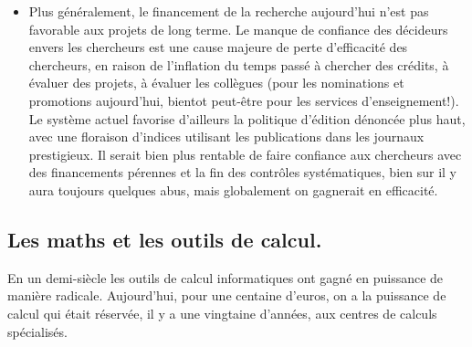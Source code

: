 \documentclass[a4paper,11pt]{article}
\begin{document}
\begin{giacjshere}
\begin{itemize}
patrimomiaux sur un logiciel c'est l'employeur de l'auteur et
pas l'auteur lui-m\^eme, or les responsables de projets,
universit\'es et autres organismes
publics de recherche sont beaucoup plus r\'eticentes au logiciel
libre que les auteurs eux-m\^emes ... surtout s'ils ont des organismes
de valorisation. Ce n'est pas seulement une question financi\`ere
mais tout simplement de qui controle quoi, une fois un logiciel
lib\'er\'e, le contr\^ole est dans les mains des personnes qui codent,
et \'echappe aux services de valorisation ou aux scientifiques
qui dirigent le projet\footnote{ainsi Allan Steel, le principal codeur du logiciel 
Magma, dont l'attractivit\'e doit tout au g\'enie algorithmique de cet
auteur, n'apparait m\^eme pas dans la citation recommend\'ee
du logiciel.}.
\item Plus g\'en\'eralement, le financement de la recherche
aujourd'hui n'est pas favorable aux projets de long terme.
Le manque de confiance des d\'ecideurs envers les chercheurs
est une cause majeure de perte d'efficacit\'e des chercheurs,
en raison de l'inflation du temps pass\'e \`a chercher des cr\'edits,
\`a \'evaluer des projets, \`a \'evaluer les coll\`egues
(pour les nominations et promotions aujourd'hui, bientot peut-\^etre pour les services
d'enseignement!). Le syst\`eme actuel favorise d'ailleurs la politique
d'\'edition d\'enonc\'ee plus haut, avec une floraison d'indices utilisant
les publications dans les journaux prestigieux. Il serait bien plus
rentable de faire confiance aux chercheurs avec des financements
p\'erennes et la fin des contr\^oles syst\'ematiques, bien sur il y aura
toujours quelques abus, mais globalement on gagnerait en efficacit\'e.
\end{itemize}

\subsection{Les maths et les outils de calcul.}
En un demi-si\`ecle les outils de calcul informatiques ont
gagn\'e en puissance de mani\`ere radicale. Aujourd'hui,
pour une centaine d'euros, on a la puissance de calcul
qui \'etait r\'eserv\'ee, il y a une vingtaine d'ann\'ees, 
aux centres de calculs sp\'ecialis\'es. 


\end{giacjshere}
\end{document}
